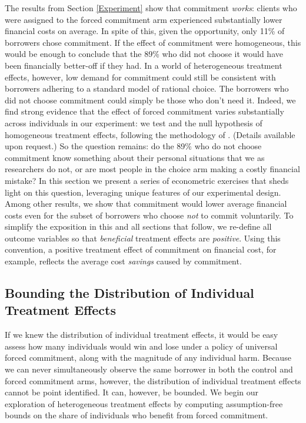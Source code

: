 \documentclass[11pt, a4paper]{article}
\begin{document}
The results from Section \ref{Experiment} show that commitment \emph{works}: clients who were assigned to the forced commitment arm experienced substantially lower financial costs on average.
In spite of this, given the opportunity, only 11\% of borrowers chose commitment. 
If the effect of commitment were homogeneous, this would be enough to conclude that the 89\% who did not choose it would have been financially better-off if they had.
In a world of heterogeneous treatment effects, however, low demand for commitment could still be consistent with borrowers adhering to a standard model of rational choice. 
The borrowers who did not choose commitment could simply be those who don't need it. 
Indeed, we find strong evidence that the effect of forced commitment varies substantially across individuals in our experiment: we test and
the null hypothesis of homogeneous treatment effects, following the methodology of \cite{chernozhukov2018generic}. (Details available upon request.)
So the question remains: do the 89\% who do not choose commitment know something about their personal situations that we as researchers do not, or are most people in the choice arm making a costly financial mistake? 
In this section we present a series of econometric exercises that sheds light on this question, leveraging unique features of our experimental design. 
Among other results, we show that commitment would lower average financial costs even for the subset of borrowers who choose \emph{not} to commit voluntarily.
To simplify the exposition in this and all sections that follow, we re-define all outcome variables so that \emph{beneficial} treatment effects are \emph{positive}. Using this convention, a positive treatment effect of commitment on financial cost, for example, reflects the average cost \emph{savings} caused by commitment.

\subsection{Bounding the Distribution of Individual Treatment Effects}
\label{sec:bounds}
If we knew the distribution of individual treatment effects, it would be easy assess how many individuals would win and lose under a policy of universal forced commitment, along with the magnitude of any individual harm. 
Because we can never simultaneously observe the same borrower in both the control and forced commitment arms, however, the distribution of individual treatment effects cannot be point identified.
It can, however, be bounded.
We begin our exploration of heterogeneous treatment effects by computing assumption-free bounds on the share of individuals who benefit from forced commitment. 
\end{document}
